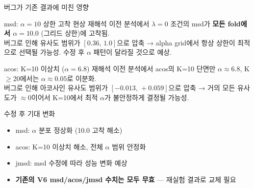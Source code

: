 \documentclass[aspectratio=169,10pt]{beamer}
\begin{document}
\begin{frame}{버그가 기존 결과에 미친 영향}
	\begin{alertblock}{msd: $\alpha=10$ 상한 고착 현상 재해석}
		이전 분석에서 $\lambda=0$ 조건의 msd가 \textbf{모든 fold에서 $\alpha=10.0$} (그리드 상한)에 고착됨.\\
		버그로 인해 유사도 범위가 $[0.36,\,1.0]$으로 압축 → alpha grid에서 항상 상한이 최적으로 선택될 가능성. 수정 후 $\alpha$ 패턴이 달라질 것으로 예상.
	\end{alertblock}

	\vspace{0.3em}
	\begin{alertblock}{acos: K=10 이상치 ($\alpha=6.8$) 재해석}
		이전 분석에서 acos의 K=10 단면만 $\alpha \approx 6.8$, K$\geq$20에서는 $\alpha \approx 0.05$로 이분화.\\
		버그로 인해 아코사인 유사도 범위가 $[-0.013,\,+0.059]$으로 압축 → 거의 모든 유사도가 $\approx0$이어서 K=10에서 최적 $\alpha$가 불안정하게 결정될 가능성.
	\end{alertblock}

	\vspace{0.3em}
	\begin{block}{수정 후 기대 변화}
		\begin{itemize}
			\item msd: $\alpha$ 분포 정상화 (10.0 고착 해소)
			\item acos: K=10 이상치 해소, 전체 $\alpha$ 범위 안정화
			\item jmsd: msd 수정에 따라 성능 변화 예상
			\item \textbf{기존의 V6 msd/acos/jmsd 수치는 모두 무효} --- 재실험 결과로 교체 필요
		\end{itemize}
	\end{block}
\end{frame}
\end{document}
